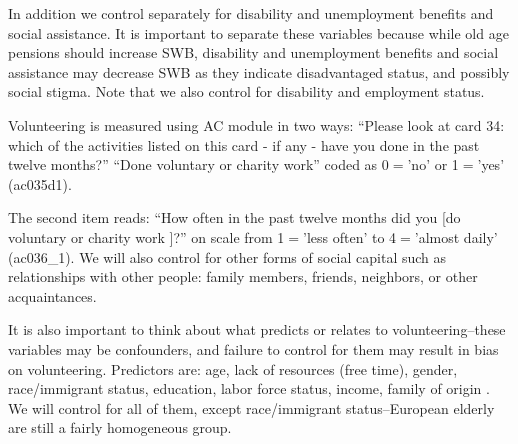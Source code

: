 \documentclass[10pt, letterpaper]{article}
\begin{document}
\begin{spacing}{1.4}
In addition we control separately for disability and unemployment benefits and social
assistance. It is important to separate these variables because while old age
pensions should increase SWB, disability and unemployment benefits and social
assistance may decrease SWB as they indicate disadvantaged status, and possibly
social stigma. Note that we also control for disability and employment status. 

Volunteering is measured using AC module in two ways: ``Please look at card 34: which of the activities listed on this card - if any - have you done in the past twelve
months?'' ``Done voluntary or charity work'' coded as 0$=$'no' or 
1$=$'yes'  (ac035d1). 

The second item reads: ``How often in the past twelve
months did you [do voluntary or charity work%
]?'' on scale from 1$=$'less often' to 4$=$'almost
daily' (ac036\_1). We will also control for other  forms of social capital such
as relationships with other people: family members, friends, neighbors, or other acquaintances. %
%
%
%

It is also important to think about what predicts or relates to
volunteering--these variables may be confounders, and failure to control for them may result in bias on
volunteering.  Predictors are: age, lack of resources (free
time), gender, race/immigrant status, education, labor force status, income,
family of origin \citet{wilson12,haski09}. %
 We will control for all of them, except race/immigrant status--European elderly
 are still a fairly homogeneous group. 



\end{spacing}
\end{document}
